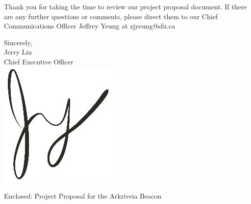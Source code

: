 \documentclass[11pt]{letter}
\begin{document}
\begin{letter}
\bigskip
Thank you for taking the time to review our project proposal document. If there are any further questions or comments, please direct them to our Chief Communications Officer Jeffrey Yeung at zjyeung@sfu.ca


\medskip
Sincerely,\\
Jerry Liu\\
Chief Executive Officer\\

\vspace*{-0.25cm}
\includegraphics[scale=0.8]{./images/signature.jpg}

{Enclosed: Project Proposal for the Arkriveia Beacon}

\end{letter}
\end{document}
